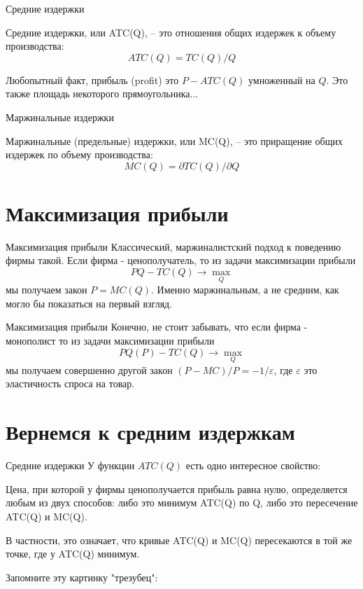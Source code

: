 \documentclass{beamer}
\begin{document}
\begin{frame}{Средние издержки}

\begin{definition}
\alert{Средние издержки}, или ATC(Q), – это отношения общих издержек к объему производства:
$$ATC(Q) = TC(Q)/Q$$
\end{definition}

Любопытный факт, прибыль (profit) это $P-ATC(Q)$ умноженный на $Q$. Это также площадь некоторого прямоугольника...

\end{frame}

\begin{frame}{Маржинальные издержки}

\begin{definition}
\alert{Маржинальные (предельные) издержки}, или MC(Q), – это приращение общих издержек по объему производства:
$$MC(Q) = \partial TC(Q)/\partial Q$$

\end{definition}

\end{frame}

\section{Максимизация прибыли}

\begin{frame}{Максимизация прибыли}
Классический, \alert{маржиналистский} подход к поведению фирмы такой. Если фирма - ценополучатель, то из задачи максимизации прибыли
$$ PQ - TC(Q) \to \max_Q$$
мы получаем закон $P=MC(Q)$. Именно маржинальным, а не средним, как могло бы показаться на первый взгляд.
\end{frame}

\begin{frame}{Максимизация прибыли}
Конечно, не стоит забывать, что если фирма - монополист то из задачи максимизации прибыли
$$ PQ(P) - TC(Q) \to \max_Q$$
мы получаем совершенно другой закон $(P-MC)/P=-1/\varepsilon$, где $\varepsilon$ это эластичность спроса на товар.
\end{frame}

\section{Вернемся к средним издержкам}

\begin{frame}{Средние издержки}
У функции $ATC(Q)$ есть одно интересное свойство:

\begin{lemma}
Цена, при которой у фирмы ценополучается прибыль равна нулю, определяется любым из двух способов: либо это минимум ATC(Q) по Q, либо это пересечение ATC(Q) и MC(Q).
\end{lemma}
В частности, это означает, что кривые ATC(Q) и MC(Q) пересекаются в той же точке, где у ATC(Q) минимум. 

Запомните эту картинку "трезубец":
\end{frame}
\end{document}
